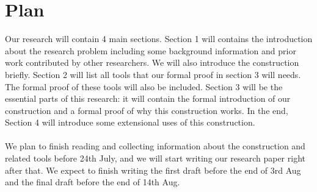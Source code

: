 \documentclass[letterpaper]{article} %
\begin{document}
	\section{Plan}
	Our research will contain 4 main sections. Section 1 will contains the introduction about the research problem including some background information and prior work contributed by other researchers. We will also introduce the construction briefly. Section 2 will list all tools that our formal proof in section 3 will needs. The formal proof of these tools will also be included. Section 3 will be the essential parts of this research: it will contain the formal introduction of our construction and a formal proof of why this construction works. In the end, Section 4 will introduce some extensional uses of this construction.\\\\
	We plan to finish reading and collecting information about the construction and related tools before 24th July, and we will start writing our research paper right after that. We expect to finish writing the first draft before the end of 3rd Aug and the final draft before the end of 14th Aug.
\end{document}
